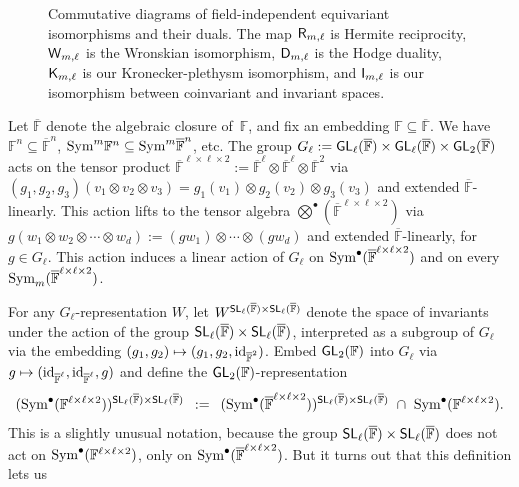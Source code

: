 \documentclass[a4paper]{extarticle}
\newcommand{\IF}{\mathbb{F}}
\newcommand{\oIF}{{\overline{\mathbb{F}}}}
\newcommand{\GL}{\textsf{\textup{GL}}}
\newcommand{\SL}{\textsf{\textup{SL}}}
\newcommand{\tensor}{{\textstyle\bigotimes}}
\newcommand{\Sym}{\textup{Sym}}
\newcommand{\id}{\textup{id}}
\newcommand{\Hodge}{\textsf{\textup{D}}}
\newcommand{\Wronski}{\textsf{\textup{W}}}
\newcommand{\Hermite}{\textsf{\textup{R}}}
\newcommand{\KP}{\textsf{\textup{K}}}
\newcommand{\I}{\textsf{\textup{I}}}
\numberwithin{theorem}{section}
\theoremstyle{definition}
\begin{document}
\begin{figure}
{
}%
\caption{Commutative diagrams of field-independent equivariant isomorphisms and their duals. The map $\Hermite_{m,\ell}$ is Hermite reciprocity, $\Wronski_{m,\ell}$ is the Wronskian isomorphism, $\Hodge_{m,\ell}$ is the Hodge duality, $\KP_{m,\ell}$ is our Kronecker-plethysm isomorphism, and $\I_{m,\ell}$ is our isomorphism between coinvariant and invariant spaces.}
\label{fig:square}
\end{figure}

Let $\oIF$ denote the algebraic closure of~$\IF$, and fix an embedding $\IF\subseteq\oIF$.
We have $\IF^n\subseteq\oIF^n$, $\Sym^m \IF^n \subseteq \Sym^m \oIF^n$, etc.
The group $G_\ell := \GL_\ell(\oIF)\times\GL_\ell(\oIF)\times\GL_2(\oIF)$ acts on the tensor product
$\oIF^{\ell\times\ell\times 2}:=\oIF^\ell \otimes \oIF^\ell \otimes \oIF^2$
via $(g_1,g_2,g_3)(v_1\otimes v_2 \otimes v_3) = g_1(v_1) \otimes g_2(v_2) \otimes g_3(v_3)$ and extended $\oIF$-linearly.
This action lifts to the tensor algebra $\tensor^\bullet(\oIF^{\ell\times\ell\times 2})$
via $g(w_1\otimes w_2 \otimes \cdots \otimes w_d) := (g w_1)\otimes \cdots \otimes (g w_d)$ and extended $\oIF$-linearly,
for $g\in G_\ell$.
This action induces a linear action of $G_\ell$ on $\Sym^\bullet(\oIF^{\ell\times\ell\times 2})$
and on every $\Sym_m(\oIF^{\ell\times\ell\times 2})$.

For any $G_\ell$-representation $W$, let 
$W^{\SL_\ell(\oIF)\times\SL_\ell(\oIF)}$
denote the space of invariants under the action of the group $\SL_\ell(\oIF)\times\SL_\ell(\oIF)$,
interpreted as a subgroup of $G_\ell$ via the embedding $(g_1,g_2) \mapsto (g_1,g_2,\id_{\oIF^2})$.
Embed $\GL_2(\IF)$ into $G_\ell$ via $g\mapsto (\id_{\oIF^\ell},\id_{\oIF^\ell},g)$ and 
define the $\GL_2(\IF)$-representation
\begin{equation}\label{eq:invariants}
(\Sym^\bullet(\IF^{\ell \times\ell \times 2}) )^{\SL_\ell(\oIF)\times\SL_\ell(\oIF)}
\, \ := \ \,
(\Sym^\bullet(\oIF^{\ell\times\ell\times 2}))^{\SL_\ell(\oIF)\times\SL_\ell(\oIF)}
\ \cap \ 
\Sym^\bullet(\IF^{\ell \times\ell \times 2}).
\end{equation}
This is a slightly unusual notation, because the group $\SL_\ell(\oIF)\times\SL_\ell(\oIF)$ does not act on $\Sym^\bullet(\IF^{\ell \times\ell \times 2})$, only on $\Sym^\bullet(\oIF^{\ell \times\ell \times 2})$. But it turns out that this definition lets us
 
\end{document}
